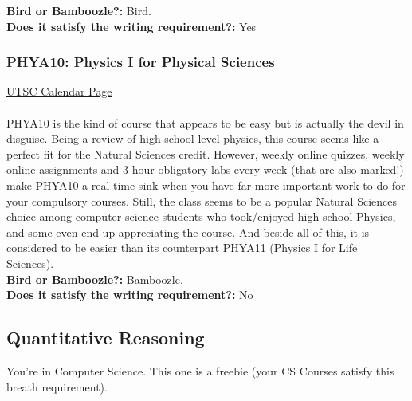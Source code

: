 \documentclass[11pt]{article}
\begin{document}
\textbf{Bird or Bamboozle?:} Bird.\\

\textbf{Does it satisfy the writing requirement?:} Yes

\subsubsection{PHYA10: Physics I for Physical Sciences}
\href{https://utsc.calendar.utoronto.ca/course/PHYA10H3}{UTSC Calendar Page}\\\\
PHYA10 is the kind of course that appears to be easy but is actually the devil in disguise. Being a review of high-school level physics, this course seems like a perfect fit for the Natural Sciences credit. However, weekly online quizzes, weekly online assignments and 3-hour obligatory labs every week (that are also marked!) make PHYA10 a real time-sink when you have far more important work to do for your compulsory courses. Still, the class seems to be a popular Natural Sciences choice among computer science students who took/enjoyed high school Physics, and some even end up appreciating the course. And beside all of this, it is considered to be easier than its counterpart PHYA11 (Physics I for Life Sciences). \\

\textbf{Bird or Bamboozle?:} Bamboozle.\\

\textbf{Does it satisfy the writing requirement?:} No


\subsection{Quantitative Reasoning}
You're in Computer Science. This one is a freebie (your CS Courses satisfy this breath requirement).
\end{document}
